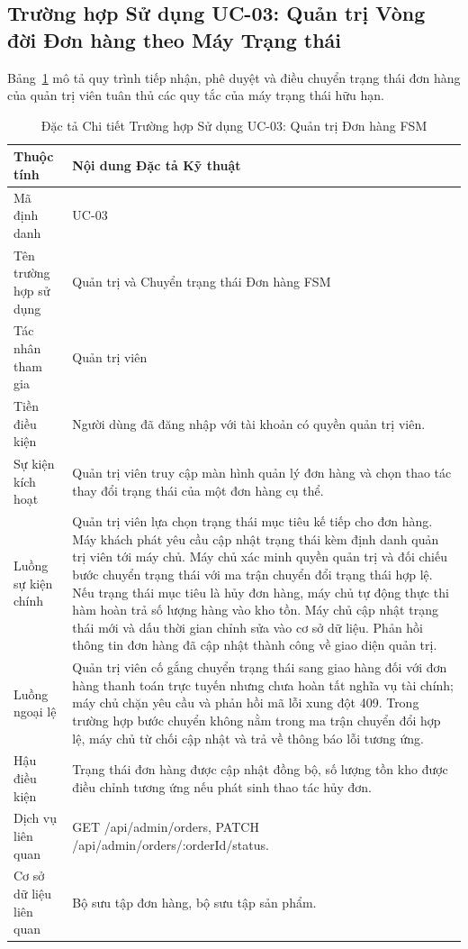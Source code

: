 \subsection{Trường hợp Sử dụng UC-03: Quản trị Vòng đời Đơn hàng theo Máy Trạng thái}
Bảng~\ref{tab:uc03} mô tả quy trình tiếp nhận, phê duyệt và điều chuyển trạng thái đơn hàng của quản trị viên tuân thủ các quy tắc của máy trạng thái hữu hạn.

\begin{table}[H]
\centering
\caption{Đặc tả Chi tiết Trường hợp Sử dụng UC-03: Quản trị Đơn hàng FSM}
\label{tab:uc03}
\begin{tabularx}{\textwidth}{p{3.5cm}X}
\toprule
\textbf{Thuộc tính} & \textbf{Nội dung Đặc tả Kỹ thuật} \\
\midrule
Mã định danh & UC-03 \\
Tên trường hợp sử dụng & Quản trị và Chuyển trạng thái Đơn hàng FSM \\
Tác nhân tham gia & Quản trị viên \\
Tiền điều kiện & Người dùng đã đăng nhập với tài khoản có quyền quản trị viên. \\
Sự kiện kích hoạt & Quản trị viên truy cập màn hình quản lý đơn hàng và chọn thao tác thay đổi trạng thái của một đơn hàng cụ thể. \\
Luồng sự kiện chính & 
Quản trị viên lựa chọn trạng thái mục tiêu kế tiếp cho đơn hàng.
Máy khách phát yêu cầu cập nhật trạng thái kèm định danh quản trị viên tới máy chủ.
Máy chủ xác minh quyền quản trị và đối chiếu bước chuyển trạng thái với ma trận chuyển đổi trạng thái hợp lệ.
Nếu trạng thái mục tiêu là hủy đơn hàng, máy chủ tự động thực thi hàm hoàn trả số lượng hàng vào kho tồn.
Máy chủ cập nhật trạng thái mới và dấu thời gian chỉnh sửa vào cơ sở dữ liệu.
Phản hồi thông tin đơn hàng đã cập nhật thành công về giao diện quản trị. \\
Luồng ngoại lệ & Quản trị viên cố gắng chuyển trạng thái sang giao hàng đối với đơn hàng thanh toán trực tuyến nhưng chưa hoàn tất nghĩa vụ tài chính; máy chủ chặn yêu cầu và phản hồi mã lỗi xung đột 409. Trong trường hợp bước chuyển không nằm trong ma trận chuyển đổi hợp lệ, máy chủ từ chối cập nhật và trả về thông báo lỗi tương ứng. \\
Hậu điều kiện & Trạng thái đơn hàng được cập nhật đồng bộ, số lượng tồn kho được điều chỉnh tương ứng nếu phát sinh thao tác hủy đơn. \\
Dịch vụ liên quan & GET /api/admin/orders, PATCH /api/admin/orders/:orderId/status. \\
Cơ sở dữ liệu liên quan & Bộ sưu tập đơn hàng, bộ sưu tập sản phẩm. \\
\bottomrule
\end{tabularx}
\end{table}


